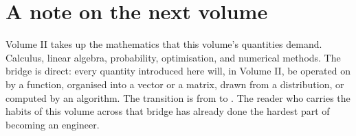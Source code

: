 \section*{A note on the next volume}

Volume II takes up the mathematics that this volume's quantities
demand. Calculus, linear algebra, probability, optimisation, and
numerical methods. The bridge is direct: every quantity introduced
here will, in Volume II, be operated on by a function, organised
into a vector or a matrix, drawn from a distribution, or computed by
an algorithm. The transition is from  to
. The reader who carries the
habits of this volume across that bridge has already done the
hardest part of becoming an engineer.

\vspace{1cm}
